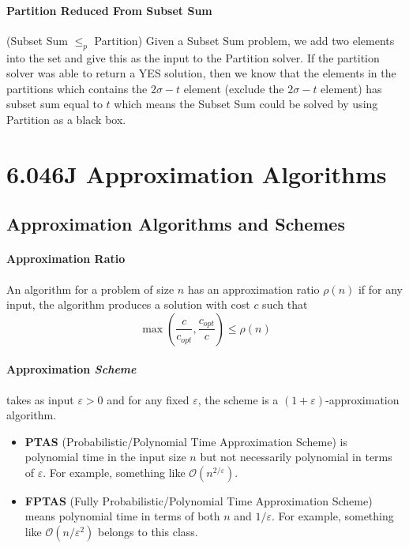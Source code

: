 \documentclass[10pt]{article}
\renewcommand{\epsilon}{\varepsilon}
\begin{document}
\paragraph{Partition Reduced From Subset Sum} (Subset Sum $\leq_p$ Partition) Given a Subset Sum problem, we add two elements into the set and give this as the input to the Partition solver. If the partition solver was able to return a YES solution, then we know that the elements in the partitions which 
contains the $2\sigma - t$ element (exclude the $2\sigma - t$ element) has subset sum equal to $t$ which means the Subset Sum could be solved by using Partition as a black box. 

\section{6.046J Approximation Algorithms}
\subsection{Approximation Algorithms and Schemes}
\paragraph{Approximation Ratio} An algorithm for a problem of size $n$ has an approximation ratio $\rho (n)$ if for any input, the algorithm produces a solution with cost $c$ such that 
\begin{equation*}
    \max \left(\frac{c}{c_{opt}}, \frac{c_{opt}}{c} \right) \leq \rho(n)
\end{equation*}

\paragraph{Approximation \textit{Scheme}} takes as input $\epsilon > 0$ and for any fixed $\epsilon$, the scheme is a $(1 + \epsilon)$-approximation algorithm. 
\begin{itemize}
    \item \textbf{PTAS} (Probabilistic/Polynomial Time Approximation Scheme) is polynomial time in the input size $n$ but not necessarily polynomial in terms of $\epsilon$. For example, something like $\mathcal{O}(n^{2/ \epsilon})$. %
    \item \textbf{FPTAS} (Fully Probabilistic/Polynomial Time Approximation Scheme) means polynomial time in terms of both $n$ and $1/\epsilon$. For example, something like $\mathcal{O}(n / \epsilon^2)$ belongs to this class. 
\end{itemize}
\end{document}
